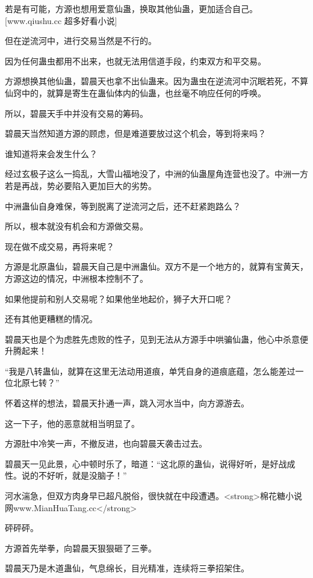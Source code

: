 
\begin{this_body}

若是有可能，方源也想用爱意仙蛊，换取其他仙蛊，更加适合自己。[www.qiushu.cc 超多好看小说]

但在逆流河中，进行交易当然是不行的。

因为任何蛊虫都用不出来，也就无法用信道手段，约束双方和平交易。

方源想换其他仙蛊，碧晨天也拿不出仙蛊来。因为蛊虫在逆流河中沉眠若死，不算仙窍中的，就算是寄生在蛊仙体内的仙蛊，也丝毫不响应任何的呼唤。

所以，碧晨天手中并没有交易的筹码。

碧晨天当然知道方源的顾虑，但是难道要放过这个机会，等到将来吗？

谁知道将来会发生什么？

经过玄极子这么一捣乱，大雪山福地没了，中洲的仙蛊屋角连营也没了。中洲一方若是再战，势必要陷入更加巨大的劣势。

中洲蛊仙自身难保，等到脱离了逆流河之后，还不赶紧跑路么？

所以，根本就没有机会和方源做交易。

现在做不成交易，再将来呢？

方源是北原蛊仙，碧晨天自己是中洲蛊仙。双方不是一个地方的，就算有宝黄天，方源这边的情况，中洲根本控制不了。

如果他提前和别人交易呢？如果他坐地起价，狮子大开口呢？

还有其他更糟糕的情况。

碧晨天也是个为虑胜先虑败的性子，见到无法从方源手中哄骗仙蛊，他心中杀意便升腾起来！

“我是八转蛊仙，就算在这里无法动用道痕，单凭自身的道痕底蕴，怎么能差过一位北原七转？”

怀着这样的想法，碧晨天扑通一声，跳入河水当中，向方源游去。

这一下子，他的恶意就相当明显了。

方源肚中冷笑一声，不撤反进，也向碧晨天袭击过去。

碧晨天一见此景，心中顿时乐了，暗道：“这北原的蛊仙，说得好听，是好战成性。说的不好听，就是没脑子！”

河水湍急，但双方肉身早已超凡脱俗，很快就在中段遭遇。<strong>棉花糖小说网www.MianHuaTang.cc</strong>

砰砰砰。

方源首先举拳，向碧晨天狠狠砸了三拳。

碧晨天乃是木道蛊仙，气息绵长，目光精准，连续将三拳招架住。


\end{this_body}
